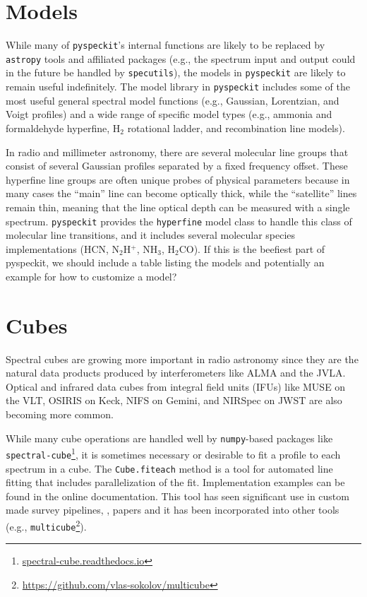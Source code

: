 \documentclass[twocolumn]{aastex62}
\newcommand{\pyspeckit}{\texttt{pyspeckit}\xspace}
\newcommand{\astropy}{\texttt{astropy}\xspace}
\newcommand{\hh}{\ensuremath{\mathrm{H}_2}\xspace}
\begin{document}
\section{Models}
\label{sec:models}
While many of \pyspeckit's internal functions are likely to be replaced by
\astropy tools and affiliated packages (e.g., the spectrum input and output
could in the future be handled by \texttt{specutils}), the models in \pyspeckit
are likely to remain useful indefinitely.  The model library in \pyspeckit
includes some of the most useful general spectral model functions (e.g.,
Gaussian, Lorentzian, and Voigt profiles) and a wide range of specific model
types (e.g., ammonia and formaldehyde hyperfine, \hh rotational ladder, and
recombination line models).

In radio and millimeter astronomy, there are several molecular line groups that
consist of several Gaussian profiles separated by a fixed frequency offset.
These hyperfine line groups are often unique probes of physical parameters
because in many cases the ``main'' line can become optically thick, while the
``satellite'' lines remain thin, meaning that the line optical depth can be
measured with a single spectrum.  \pyspeckit provides the \texttt{hyperfine}
model class to handle this class of molecular line transitions, and it includes
several molecular species implementations (HCN, N$_2$H$^+$, NH$_3$,
H$_2$CO). {\color{red}If this is the beefiest part of pyspeckit, we should include a table
listing the models and potentially an example for how to customize a model?}

\section{Cubes}
\label{sec:cubes}
Spectral cubes are growing more important in radio astronomy since they are the
natural data products produced by interferometers like ALMA and the JVLA.
Optical and infrared data cubes from integral field units (IFUs) like MUSE on
the VLT, OSIRIS on Keck,  NIFS on Gemini, and NIRSpec on JWST are also becoming
more common.

While many cube operations are handled well by \texttt{numpy}-based packages
like \texttt{spectral-cube}\footnote{\url{spectral-cube.readthedocs.io}},
it is sometimes necessary or desirable to fit a profile to each spectrum
in a cube.  The \texttt{Cube.fiteach} method is a tool for automated line
fitting that includes parallelization of the fit. Implementation examples can be
found in the online documentation. This tool  has  seen significant use in 
custom made survey pipelines, 
\citep[e.g.][\url{https://github.com/GBTAmmoniaSurvey/GAS}]{Friesen2017-GAS}, 
papers and it has been incorporated into other tools (e.g.,
\texttt{multicube}\footnote{\url{https://github.com/vlas-sokolov/multicube}}).
\end{document}
